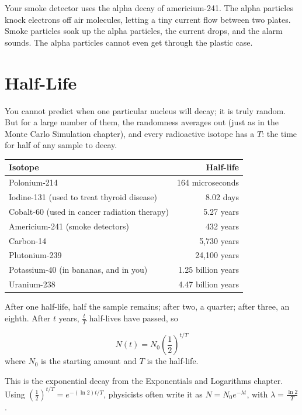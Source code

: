Your smoke detector uses the alpha decay of americium-241. The alpha particles knock electrons off
air molecules, letting a tiny current flow between two plates. Smoke particles soak up the alpha
particles, the current drops, and the alarm sounds. The alpha particles cannot even get through the
plastic case.

\section{Half-Life}
You cannot predict when one particular nucleus will decay; it is truly random. But for a large
number of them, the randomness averages out (just as in the Monte Carlo Simulation chapter), and every
radioactive isotope has a  $T$: the time for half of any sample to decay.

\begin{center}
\begin{tabular}{l|r}
Isotope & Half-life \\
\hline
Polonium-214 & 164 microseconds \\
Iodine-131 (used to treat thyroid disease) & 8.02 days \\
Cobalt-60 (used in cancer radiation therapy) & 5.27 years \\
Americium-241 (smoke detectors) & 432 years \\
Carbon-14 & 5,730 years \\
Plutonium-239 & 24,100 years \\
Potassium-40 (in bananas, and in you) & 1.25 billion years \\
Uranium-238 & 4.47 billion years \\
\end{tabular}
\end{center}

After one half-life, half the sample remains; after two, a quarter; after three, an eighth. After $t$
years, $\frac{t}{T}$ half-lives have passed, so

\begin{mdframed}[style = important, frametitle = {Radioactive Decay}]
$$N(t) = N_0\left(\frac{1}{2}\right)^{t/T}$$
where $N_0$ is the starting amount and $T$ is the half-life.
\end{mdframed}

This is the exponential decay from the Exponentials and Logarithms chapter. Using
$\left(\frac{1}{2}\right)^{t/T} = e^{-(\ln 2)t/T}$, physicists often write it as $N = N_0e^{-\lambda t}$, with
 $\lambda = \frac{\ln 2}{T}$.

